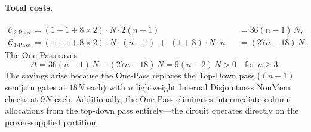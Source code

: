 \documentclass[sigconf]{acmart}
\begin{document}
\paragraph{Total costs.}
\[
\begin{aligned}
\mathcal{C}_{\text{2-Pass}} &= (1{+}1{+}8 \times 2) \cdot N \cdot 2(n{-}1) &&= 36(n{-}1)\,N, \\[4pt]
\mathcal{C}_{\text{1-Pass}} &= (1{+}1{+}8 \times 2) \cdot N \cdot (n{-}1) \;+\; (1{+}8) \cdot N \cdot n &&= (27n{-}18)\,N.
\end{aligned}
\]
The One-Pass saves
\[
\Delta = 36(n{-}1)\,N - (27n{-}18)\,N = 9(n{-}2)\,N > 0 \quad \text{for } n \geq 3.
\]
The savings arise because the One-Pass replaces the Top-Down pass ($(n{-}1)$ semijoin gates at $18N$ each) with $n$ lightweight Internal Disjointness NonMem checks at $9N$ each.
Additionally, the One-Pass eliminates intermediate column allocations from the top-down pass entirely---the circuit operates directly on the prover-supplied partition.
\end{document}
